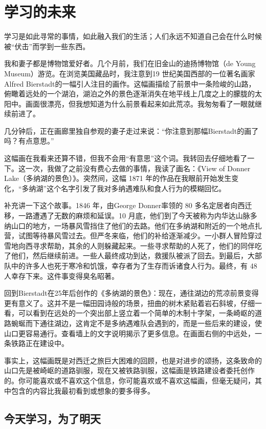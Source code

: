 \chapter{学习的未来}
学习是如此寻常的事情，如此融入我们的生活；人们永远不知道自己会在什么时候被“伏击”而学到一些东西。

我和妻子都是博物馆爱好者。几个月前，我们在旧金山的迪扬博物馆（de Young Museum）游览。在浏览美国藏品时，我注意到19 世纪美国西部的一位著名画家Alfred Bierstadt的一幅引人注目的画作。这幅画描绘了前景中一条险峻的山路，俯瞰着远处的一个湖泊，湖泊之外的景色逐渐消失在地平线上几度之上的朦胧的太阳中。画面很漂亮，但我想知道为什么前景看起来如此荒凉。我匆匆看了一眼就继续前进了。

几分钟后，正在画廊里独自参观的妻子走过来说：“你注意到那幅Bierstadt的画了吗？有点意思。”

这幅画在我看来还算不错，但我不会用“有意思”这个词。我转回去仔细地看了一下。这一次，我做了之前没有费心去做的事情，我读了画名：《View of Donner Lake（多纳湖的景色）》。突然间，这幅 1871 年的作品在我眼前开始发生变化，“多纳湖”这个名字引发了我对多纳遇难队和食人行为的模糊回忆。

补充讲一下这个故事。1846 年，由George Donner率领的 80 多名定居者向西迁移，一路遭遇了无数的麻烦和延误。10 月底，他们到了今天被称为内华达山脉多纳山口的地方，一场暴风雪挡住了他们的去路。他们在多纳湖和附近的一个地点扎营，试图等待暴风雪过去。但严冬来临，他们的补给逐渐减少。一小群人冒险穿过雪地向西寻求帮助，其余的人则躲藏起来。一些寻求帮助的人死了，他们的同伴吃了他们，然后继续前进。一些人最终成功到达，救援队被派了回去。到最后，大部队中的许多人也死于寒冷和饥饿，幸存者为了生存而诉诸食人行为。最终，有 48 人幸存下来。这件事变得臭名昭著。

回到Bierstadt在25年后创作的《多纳湖的景色》：现在，通往湖边的荒凉前景变得更有意义了。这并不是一幅田园诗般的场景，扭曲的树木紧贴着岩石斜坡，仔细一看，可以看到在远处的一个突出部上竖立着一个简单的木制十字架，一条崎岖的道路蜿蜒而下通往湖边，这肯定不是多纳遇难队会遇到的，而是一些后来的建设，使山口更容易通行。查看墙上的文字说明揭示了更多信息。在画面右侧的中远处，一条铁路正在建设中。

事实上，这幅画既是对西迁之旅巨大困难的回顾，也是对进步的颂扬，这条致命的山口先是被崎岖的道路驯服，现在又被铁路驯服，这幅画是铁路建设者委托创作的。你可能喜欢或不喜欢这个信息，你可能喜欢或不喜欢这幅画，但毫无疑问，其中包含的内容比我最初看到或想象的要多得多。

\section*{今天学习，为了明天}

